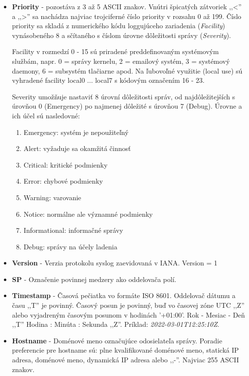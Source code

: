 \documentclass[12pt, a4paper]{article}
\begin{document}
\begin{itemize}
\setlength\itemsep{0em}
\item \textbf{Priority} - pozostáva z 3 až 5 ASCII znakov. Vnútri špicatých zátvoriek ,,<'' a ,,>'' sa nachádza najviac trojciferné číslo priority v rozsahu 0 až 199. Číslo priority sa skladá z numerického kódu loggujúceho zariadenia (\textit{Facility}) 
vynásobeného 8 a sčítaného s číslom úrovne dôležitosti správy (\textit{Severity}). 

Facility v rozmedzí 0 - 15 sú priradené preddefinovaným systémovým službám, napr. 0 = správy kernelu, 2 = emailový systém, 3 = 
systémový daemony, 6 = subsystém tlačiarne apod. Na ľubovoľné využitie (local use) sú vyhradené facility local0 ... local7 s kódovým 
označením 16 - 23.

Severity umožňuje nastaviť 8 úrovní dôležitosti správ, od najdôležitejších s úrovňou 0 (Emergency) po najmenej dôležité s úrovňou 7
(Debug). Úrovne a ich účel sú nasledovné:
	\begin{enumerate}
		\setcounter{enumi}{0}
		\item Emergency: systém je nepoužiteľný
		\item Alert: vyžaduje sa okamžitá činnosť
		\item Critical: kritické podmienky
		\item Error: chybové podmienky
		\item Warning: varovanie
		\item Notice: normálne ale významné podmienky
		\item Informational: informačné správy
		\item Debug: správy na účely ladenia
	\end{enumerate}
\item \textbf{Version} - Verzia protokolu syslog zaevidovaná v IANA. Version = 1
\item \textbf{SP} - Označenie povinnej medzery ako oddelovača polí.
\item \textbf{Timestamp} - Časová pečiatka vo formáte ISO 8601. Oddelovač dátumu a času ,,T'' je povinný. Časový posun je povinný, buď vo časovej zóne UTC ,,Z'' alebo vyjadreným časovým posunom v hodinách '+01:00'. Rok - Mesiac - Deň ,,T'' Hodina : Minúta : Sekunda ,,Z''. Príklad: \textit{2022-03-01T12:25:10Z}.
\item \textbf{Hostname} - Doménové meno označujúce odosielateľa správy. Poradie preferencie pre hostname sú: plne kvalifikované doménové meno, statická IP adresa, doménové meno, dynamická IP adresa alebo ,,-''. Najviac 255 ASCII znakov.

\end{itemize}
\end{document}
